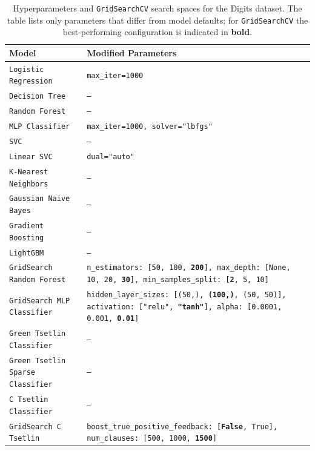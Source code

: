 \documentclass[english]{aghengthesis} %
\begin{document}
\begin{table}[!htbp]
\centering
\caption[Digits Hyperparameters]{Hyperparameters and \texttt{GridSearchCV} search spaces for the Digits dataset. The table lists only parameters that differ from model defaults; for \texttt{GridSearchCV} the best-performing configuration is indicated in \textbf{bold}.}
\begin{tabularx}{\columnwidth}{@{}l L@{}} \toprule
    \textbf{Model} & \textbf{Modified Parameters} \\ \midrule \midrule
    \texttt{Logistic Regression} & \texttt{max\_iter=1000} \\ \midrule
    \texttt{Decision Tree} & \texttt{---} \\ \midrule
    \texttt{Random Forest} & \texttt{---} \\ \midrule
    \texttt{MLP Classifier} & \texttt{max\_iter=1000, solver="lbfgs"} \\ \midrule
    \texttt{SVC} & \texttt{---} \\ \midrule
    \texttt{Linear SVC} & \texttt{dual="auto"} \\ \midrule
    \texttt{K-Nearest Neighbors} & \texttt{---} \\ \midrule
    \texttt{Gaussian Naive Bayes} & \texttt{---} \\ \midrule
    \texttt{Gradient Boosting} & \texttt{---} \\ \midrule
    \texttt{LightGBM} & \texttt{---} \\ \midrule
    \texttt{GridSearch Random Forest} & \texttt{n\_estimators: [50, 100, \textbf{200}], max\_depth: [None, 10, 20, \textbf{30}], min\_samples\_split: [\textbf{2}, 5, 10]} \\ \midrule
    \texttt{GridSearch MLP Classifier} & \texttt{hidden\_layer\_sizes: [(50,), \textbf{(100,)}, (50, 50)], activation: ["relu", \textbf{"tanh"}], alpha: [0.0001, 0.001, \textbf{0.01}]} \\ \midrule \midrule
    \texttt{Green Tsetlin Classifier} & \texttt{---}\\ \midrule
    \texttt{Green Tsetlin Sparse Classifier} & \texttt{---} \\ \midrule
    \texttt{C Tsetlin Classifier} & \texttt{---} \\ \midrule
    \texttt{GridSearch C Tsetlin} & \texttt{boost\_true\_positive\_feedback: [\textbf{False}, True], num\_clauses: [500, 1000, \textbf{1500}]} \\ \bottomrule
\end{tabularx}
\label{tab:digits-params}
\end{table}
\end{document}
